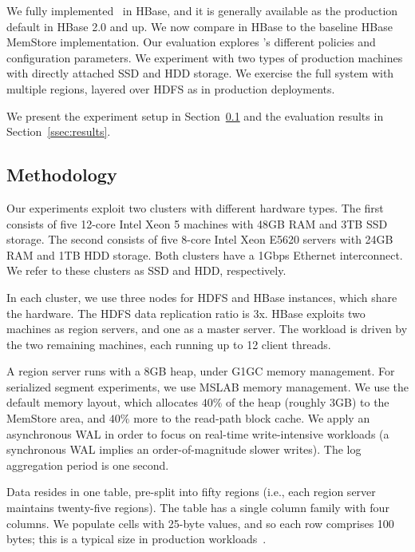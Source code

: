 We fully implemented \sys\ in HBase, and it is generally available as the production default in HBase 2.0 and up. 
We now compare \sys\/ in HBase to the baseline HBase MemStore implementation.  
Our evaluation explores \sys's different policies and configuration parameters.  
We experiment with two types of production machines with directly attached SSD 
and HDD storage. We exercise the full system with multiple regions, layered over HDFS
as in production deployments.

We present the experiment setup in Section~\ref{ssec:setup} and the evaluation 
results in Section~\ref{ssec:results}. 

\subsection{Methodology}
\label{ssec:setup}

Our experiments exploit two clusters with different hardware types. The first  consists of five 12-core Intel Xeon 5 
machines with 48GB RAM and 3TB SSD storage. The second  consists of five 8-core Intel Xeon E5620 servers 
with 24GB RAM and 1TB HDD storage. Both clusters have a 1Gbps Ethernet interconnect. We refer to these clusters as
SSD and HDD, respectively.

In each cluster, we use three nodes for HDFS and HBase instances, which share the hardware. The HDFS data 
replication ratio is 3x. HBase exploits two machines as region servers, and one as a master server. 
The workload is driven by the two remaining machines, each running up to 12 client threads. 

A region server runs  with a 8GB heap, under G1GC memory management. For serialized segment experiments, we use MSLAB memory management.
We use the default memory layout,  which allocates $40\%$ of the heap (roughly 3GB) to the MemStore 
area, and $40\%$ more to the read-path block cache. We apply an asynchronous WAL in order to focus on real-time 
write-intensive workloads (a synchronous WAL implies an order-of-magnitude slower writes). The log aggregation
period is one second. 


Data resides in one table, pre-split into fifty regions (i.e., each region server maintains twenty-five regions). 
The table has a single column family with four columns. 
We populate cells with 25-byte values, and so each row comprises 100 bytes; 
this is a typical size in production workloads~\cite{Wu2015}.

